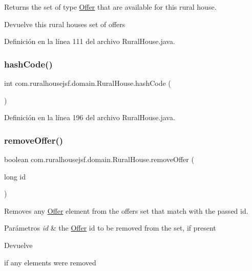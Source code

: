 Returns the set of type \mbox{\hyperlink{a00184}{Offer}} that are available for this rural house. 

\begin{DoxyReturn}{Devuelve}
this rural houses set of offers 
\end{DoxyReturn}


Definición en la línea 111 del archivo Rural\+House.\+java.

\mbox{\label{a00188_a12fcb2ec3f802b71b5a1357622255b86}} 
\subsubsection{\texorpdfstring{hashCode()}{hashCode()}}
{\footnotesize\ttfamily int com.\+ruralhousejsf.\+domain.\+Rural\+House.\+hash\+Code (\begin{DoxyParamCaption}{ }\end{DoxyParamCaption})}



Definición en la línea 196 del archivo Rural\+House.\+java.

\mbox{\label{a00188_ab6443a7d5fdef35c6a04110d497ddb16}} 
\subsubsection{\texorpdfstring{removeOffer()}{removeOffer()}\hspace{0.1cm}{\footnotesize\ttfamily [1/2]}}
{\footnotesize\ttfamily boolean com.\+ruralhousejsf.\+domain.\+Rural\+House.\+remove\+Offer (\begin{DoxyParamCaption}\item[{long}]{id }\end{DoxyParamCaption})}



Removes any \mbox{\hyperlink{a00184}{Offer}} element from the offers set that match with the passed id. 


\begin{DoxyParams}{Parámetros}
{\em id} & the \mbox{\hyperlink{a00184}{Offer}} id to be removed from the set, if present \\
\hline
\end{DoxyParams}
\begin{DoxyReturn}{Devuelve}

\begin{DoxyCode}{0}
\DoxyCodeLine{\textcolor{keyword}{true} }
\end{DoxyCode}
 if any elements were removed 
\end{DoxyReturn}


